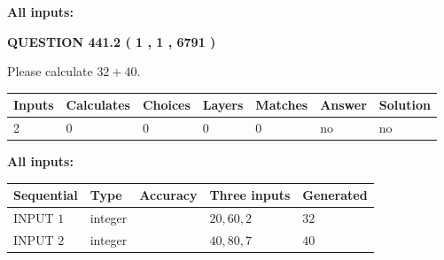 \documentclass[12pt]{article}
\begin{document}
   
   
   
\noindent{}
   
   
   
   
\noindent\vspace{0.1in}\hspace{-0.08in} {\textbf{\Large{All inputs: }}}
   
   
  
\vspace{0.2in}
  
{\textbf{\Large{QUESTION
441.2 
 ( 1 , 1 , 6791 )
}}}
  
  
 
Please calculate $ %
32 +  %
40 $.
 
 
   
   
   
   
\noindent\begin{tabular}{|l|l|l|l|l|l|l|}
 \hline
Inputs & Calculates & Choices & Layers & Matches & Answer & Solution \\ \hline
 2  & 
 0  & 
 0
  & 
 0  & 
 0  & 
  no & 
  no 
  \\ \hline
 \end{tabular}
   
   
   
   
\noindent{}
   
   
   
   
\noindent\vspace{0.1in}\hspace{-0.08in} {\textbf{\Large{All inputs: }}}
   
   
  
  
\noindent\begin{tabular}{|l|l|l|l|l|}
\hline
 Sequential & Type & Accuracy & Three inputs & Generated \\ 
\hline
 
 
  INPUT $  1 $ & integer &  & $
 20
 , 
 60
 , 
 2
 $ & $ 32 $ 
 \\  \hline  
 
 
  INPUT $  2 $ & integer &  & $
 40
 , 
 80
 , 
 7
 $ & $ 40 $ 
 \\  \hline  
 \end{tabular}
   
   
   
   
   
   
 \vspace{0.2in}
 
\end{document}

